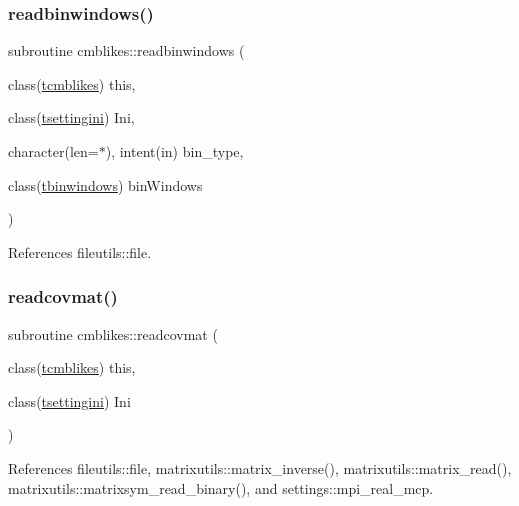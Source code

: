 \mbox{\label{namespacecmblikes_a44827afcb3b8cf727e566cb8919f7e0e}} 
\subsubsection{\texorpdfstring{readbinwindows()}{readbinwindows()}}
{\footnotesize\ttfamily subroutine cmblikes\+::readbinwindows (\begin{DoxyParamCaption}\item[{class(\mbox{\hyperlink{structcmblikes_1_1tcmblikes}{tcmblikes}})}]{this,  }\item[{class(\mbox{\hyperlink{structsettings_1_1tsettingini}{tsettingini}})}]{Ini,  }\item[{character(len=$\ast$), intent(in)}]{bin\+\_\+type,  }\item[{class(\mbox{\hyperlink{structcmblikes_1_1tbinwindows}{tbinwindows}})}]{bin\+Windows }\end{DoxyParamCaption})\hspace{0.3cm}{\ttfamily [private]}}



References fileutils\+::file.

\mbox{\label{namespacecmblikes_a53d98d3cf4a8d20dca8c46be7bd33329}} 
\subsubsection{\texorpdfstring{readcovmat()}{readcovmat()}}
{\footnotesize\ttfamily subroutine cmblikes\+::readcovmat (\begin{DoxyParamCaption}\item[{class(\mbox{\hyperlink{structcmblikes_1_1tcmblikes}{tcmblikes}})}]{this,  }\item[{class(\mbox{\hyperlink{structsettings_1_1tsettingini}{tsettingini}})}]{Ini }\end{DoxyParamCaption})\hspace{0.3cm}{\ttfamily [private]}}



References fileutils\+::file, matrixutils\+::matrix\+\_\+inverse(), matrixutils\+::matrix\+\_\+read(), matrixutils\+::matrixsym\+\_\+read\+\_\+binary(), and settings\+::mpi\+\_\+real\+\_\+mcp.

